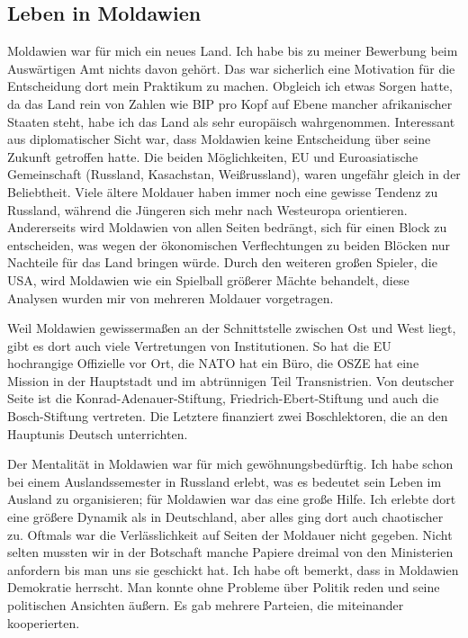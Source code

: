 \documentclass[12pt,a4paper, headsepline]{scrartcl}
\begin{document}
\subsection{Leben in Moldawien}
Moldawien war für mich ein neues Land. Ich habe bis zu meiner Bewerbung beim Auswärtigen Amt nichts davon gehört. Das war sicherlich eine Motivation für die Entscheidung dort mein Praktikum zu machen. Obgleich ich etwas Sorgen hatte, da das Land rein von Zahlen wie BIP pro Kopf auf Ebene mancher afrikanischer Staaten steht, habe ich das Land als sehr europäisch wahrgenommen. Interessant aus diplomatischer Sicht war, dass Moldawien keine Entscheidung über seine Zukunft getroffen hatte. Die beiden Möglichkeiten, EU und Euroasiatische Gemeinschaft (Russland, Kasachstan, Weißrussland), waren ungefähr gleich in der Beliebtheit. Viele ältere Moldauer haben immer noch eine gewisse Tendenz zu Russland, während die Jüngeren sich mehr nach Westeuropa orientieren. Andererseits wird Moldawien von allen Seiten bedrängt, sich für einen Block zu entscheiden, was wegen der ökonomischen Verflechtungen zu beiden Blöcken nur Nachteile für das Land bringen würde. Durch den weiteren großen Spieler, die USA, wird Moldawien wie ein Spielball größerer Mächte behandelt, diese Analysen wurden mir von mehreren Moldauer vorgetragen.

Weil Moldawien gewissermaßen an der Schnittstelle zwischen Ost und West liegt, gibt es dort auch viele Vertretungen von Institutionen. So hat die EU hochrangige Offizielle vor Ort, die NATO hat ein Büro, die OSZE hat eine Mission in der Hauptstadt und im abtrünnigen Teil Transnistrien. Von deutscher Seite ist die Konrad-Adenauer-Stiftung, Friedrich-Ebert-Stiftung und auch die Bosch-Stiftung vertreten. Die Letztere finanziert zwei Boschlektoren, die an den Hauptunis Deutsch unterrichten.

Der Mentalität in Moldawien war für mich gewöhnungsbedürftig. Ich habe schon bei einem Auslandssemester in Russland erlebt, was es bedeutet sein Leben im Ausland zu organisieren; für Moldawien war das eine große Hilfe. Ich erlebte dort eine größere Dynamik als in Deutschland, aber alles ging dort auch chaotischer zu. Oftmals war die Verlässlichkeit auf Seiten der Moldauer nicht gegeben. Nicht selten mussten wir in der Botschaft manche Papiere dreimal von den Ministerien anfordern bis man uns sie geschickt hat. Ich habe oft bemerkt, dass in Moldawien Demokratie herrscht. Man konnte ohne Probleme über Politik reden und seine politischen Ansichten äußern. Es gab mehrere Parteien, die miteinander kooperierten. 
\end{document}
